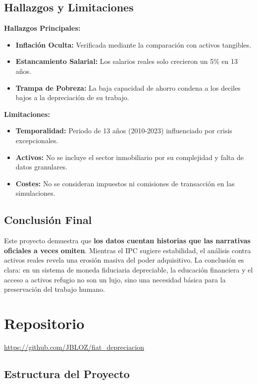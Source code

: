 \documentclass{article}
\begin{document}
\subsection{Hallazgos y Limitaciones}

\textbf{Hallazgos Principales:}
\begin{itemize}
    \item \textbf{Inflaci\'on Oculta:} Verificada mediante la comparaci\'on con activos tangibles.
    \item \textbf{Estancamiento Salarial:} Los salarios reales solo crecieron un 5\% en 13 a\~nos.
    \item \textbf{Trampa de Pobreza:} La baja capacidad de ahorro condena a los deciles bajos a la depreciaci\'on de su trabajo.
\end{itemize}

\textbf{Limitaciones:}
\begin{itemize}
    \item \textbf{Temporalidad:} Periodo de 13 a\~nos (2010-2023) influenciado por crisis excepcionales.
    \item \textbf{Activos:} No se incluye el sector inmobiliario por su complejidad y falta de datos granulares.
    \item \textbf{Costes:} No se consideran impuestos ni comisiones de transacci\'on en las simulaciones.
\end{itemize}

\subsection{Conclusi\'on Final}

Este proyecto demuestra que \textbf{los datos cuentan historias que las narrativas oficiales a veces omiten}. Mientras el IPC sugiere estabilidad, el an\'alisis contra activos reales revela una erosi\'on masiva del poder adquisitivo. La conclusi\'on es clara: en un sistema de moneda fiduciaria depreciable, la educaci\'on financiera y el acceso a activos refugio no son un lujo, sino una necesidad b\'asica para la preservaci\'on del trabajo humano.

\section{Repositorio}

\url{https://github.com/JBLOZ/fiat_depreciacion}   

\subsection{Estructura del Proyecto}
\end{document}
